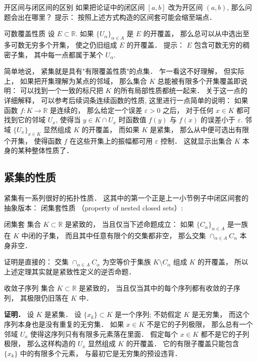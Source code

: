 \begin{exercise}{开区间与闭区间的区别}
如果把论证中的闭区间 $[a,b]$ 改为开区间 $(a,b)$, 那么问题会出在哪里？ 提示： 按照上述方式构造的区间套可能会缩至端点．
\end{exercise}

\begin{exercise}{可数覆盖性质}
设 $E\subset\mathbb{R}$. 如果 $\{U_\alpha\}_{\alpha\in A}$ 是 $E$ 的开覆盖， 那么总可以从中选出至多可数无穷多个开集， 使之仍旧组成 $E$ 的开覆盖． 提示： $E$ 包含可数无穷的稠密子集， 其中每一点都属于某个 $U_\alpha$.
\end{exercise}

简单地说， 紧集就是具有"有限覆盖性质"的点集． 乍一看这不好理解， 但实际上， 如果把开集理解为某点的邻域， 那么集合 $K$ 总能被有限多个开集覆盖即说明： 可以找到一个一致的标尺把 $K$ 的所有局部性质都统一起来． 关于这一点的详细解释， 可以参考后续词条连续函数的性质, 这里进行一点简单的说明： 如果函数 $f:K\to\mathbb{R}$ 是连续的， 那么给定一个误差 $\varepsilon>0$ 之后， 对于任何 $x\in K$ 都可找到它的邻域 $U_{x}$, 使得当 $y\in K\cap U_x$ 时函数值 $f(y)$ 与 $f(x)$ 的误差小于 $\varepsilon$. 邻域 $\{U_x\}_{x\in K}$ 显然组成 $K$ 的开覆盖， 而如果 $K$ 是紧集， 那么从中便可选出有限个开集， 使得函数 $f$ 在这些开集上的振幅都可用 $\varepsilon$ 控制． 这就显示出集合 $K$ 本身的某种整体性质了．

\subsection{紧集的性质}
紧集有一系列很好的拓扑性质． 这其中的第一个正是上一小节例子中闭区间套的抽象版本： 闭集套性质 （property of nested closed sets）:

\begin{theorem}{闭集套}
集合 $K\subset\mathbb{R}$ 是紧致的， 当且仅当下述命题成立： 如果 $\{C_\alpha\}_{\alpha\in A}$ 是一族在 $K$ 中闭的子集， 而且其中任意有限个的交集都非空， 那么交集 $\cap_{\alpha\in A}C_\alpha$ 本身非空． 
\end{theorem}

证明是直接的： 交集 $\cap_{\alpha\in A}C_\alpha$ 为空等价于集族 $K\setminus C_\alpha$ 组成 $K$ 的开覆盖， 所以上述定理其实就是紧致性定义的逆否命题．

\begin{theorem}{收敛子序列}
集合 $K\subset\mathbb{R}$ 是紧致的， 当且仅当其中的每个序列都有收敛的子序列， 其极限仍旧落在 $K$ 中．
\end{theorem}

\textbf{证明．} 设 $K$ 是紧集． 设 $\{x_k\}\subset K$ 是一个序列; 不妨假定 $K$ 是无穷集， 而这个序列本身也是没有重复的无穷集． 如果 $x\in K$ 不是它的子列极限， 那么总有一个邻域 $U_x$ 使得这序列只有有限多元素落在里面． 假定每个 $x\in K$ 都不是它的子列极限， 那么这样构造的 $U_x$ 显然组成 $K$ 的开覆盖． 它的有限子覆盖只能包含 $\{x_k\}$ 中的有限多个元素， 与最初它是无穷集的预设违背．

